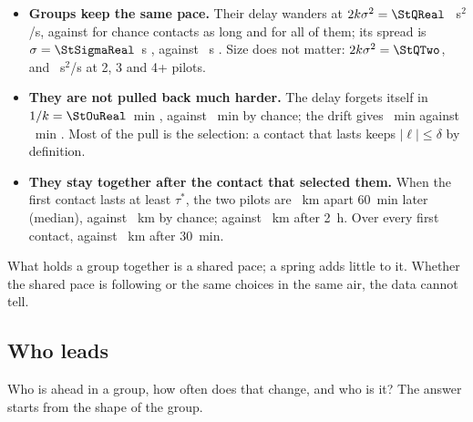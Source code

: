 \begin{itemize}
  \item \textbf{Groups keep the same pace.} Their delay wanders at $2k\sigma^2=\StQReal$ \StQRealBand~s$^2$/s,
        against \StQChanceLong{} \StQChanceLongBand{} for chance contacts as long and \StQChance{}
        \StQChanceBand{} for all of them; its spread is $\sigma=\StSigmaReal$~s \StSigmaRealBand, against
        \StSigmaChance~s \StSigmaChanceBand. Size does not matter: $2k\sigma^2=\StQTwo$, \StQThree{} and
        \StQFour~s$^2$/s at 2, 3 and 4+ pilots.
  \item \textbf{They are not pulled back much harder.} The delay forgets itself in $1/k=\StOuReal$~min
        \StOuRealBand, against \StOuChance~min \StOuChanceBand{} by chance; the drift gives \StDriftReal~min
        \StDriftRealBand{} against \StDriftChance~min \StDriftChanceBand. Most of the pull is the
        selection: a contact that lasts keeps $|\ell|\le\delta$ by definition.
  \item \textbf{They stay together after the contact that selected them.} When the first contact lasts
        at least $\tau^*$, the two pilots are \StSepRealLongSixty~km apart 60~min later (median), against
        \StSepChanceLongSixty~km by chance; \StSepRealLongTwoHours{} against \StSepChanceLongTwoHours~km
        after 2~h. Over every first contact, \StSepRealThirty{} against \StSepChanceThirty~km after 30~min.
\end{itemize}
What holds a group together is a shared pace; a spring adds little to it. Whether the shared pace
is following or the same choices in the same air, the data cannot tell.

\subsection{Who leads}\label{sec:leaders}

Who is ahead in a group, how often does that change, and who is it? The answer starts from the
shape of the group.

